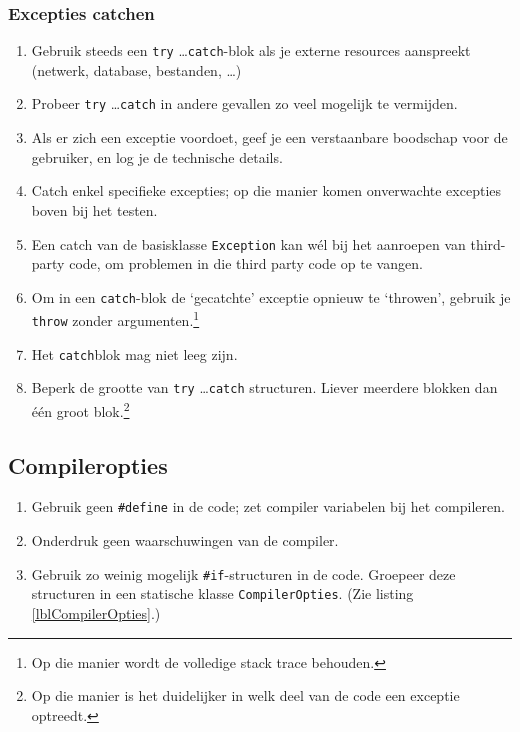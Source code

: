 \documentclass[a4paper,11pt]{article}
\begin{document}
\subsubsection{Excepties catchen}
\begin{enumerate}[resume]
\item Gebruik steeds een \lstinline !try! \ldots \lstinline !catch!-blok
als je externe resources aanspreekt (netwerk, database, bestanden,
\ldots)
\item Probeer \lstinline !try! \ldots \lstinline !catch! in andere
gevallen zo veel mogelijk te vermijden.
\item Als er zich een exceptie voordoet, geef je een verstaanbare boodschap voor de gebruiker,
en log je de technische details.
\item Catch enkel specifieke excepties; op die manier komen onverwachte
excepties boven bij het testen.
\item Een catch van de basisklasse \lstinline !Exception! kan w\'el bij het aanroepen van
third-party code, om problemen in die third party code op te vangen.
\item Om in een \lstinline !catch!-blok de `gecatchte' exceptie opnieuw te `throwen', gebruik je
\lstinline !throw! zonder argumenten.\footnote{Op die manier wordt de volledige stack trace
behouden.}
\item Het \lstinline !catch!blok mag niet leeg zijn.
\item Beperk de grootte van \lstinline !try! \ldots \lstinline !catch! structuren.  Liever
meerdere blokken dan \'e\'en groot blok.\footnote{Op die manier is het duidelijker in welk deel
van de code een exceptie optreedt.}
\end{enumerate}


\subsection{Compileropties}
\begin{enumerate}[resume]
\item Gebruik geen \lstinline !#define! in de code; zet compiler variabelen
bij het compileren.
\item Onderdruk geen waarschuwingen van de compiler.
\item Gebruik zo weinig mogelijk 
\lstinline !#if!-structuren in de code.  Groepeer deze structuren in een statische klasse
\lstinline !CompilerOpties!.  (Zie listing \ref{lblCompilerOpties}.)
\end{enumerate}
\end{document}
